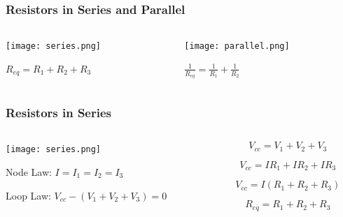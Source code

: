 \documentclass{beamer}
\begin{document}
\begin{frame}
\frametitle{Resistors in Series and Parallel}
\begin{columns}
\begin{column}{5cm}
\begin{center}
\texttt{[image: series.png]}

\vspace{0.5cm}

$R_{eq} = R_1+R_2+R_3$
\end{center}
\end{column}
\begin{column}{5cm}
\begin{center}
\texttt{[image: parallel.png]}

\vspace{0.5cm}

$\frac{1}{R_{eq}} = \frac{1}{R_1}+\frac{1}{R_2}$
\end{center}
\end{column}
\end{columns}
\end{frame}

\begin{frame}\frametitle{Resistors in Series}
\begin{columns}
\begin{column}{5cm}
\begin{center}
\texttt{[image: series.png]}

\vspace{0.5cm}

Node Law: $I = I_1 = I_2 = I_3$

\vspace{0.2cm}

Loop Law: $V_{cc} - (V_1 + V_2 + V_3) = 0$

\end{center}
\end{column}
\begin{column}{5cm}

\begin{equation}
V_{cc} = V_1 + V_2 + V_3
\end{equation}

\begin{equation}
V_{cc} = I R_1 + I R_2 + I R_3
\end{equation}

\begin{equation}
V_{cc} = I (R_1 + R_2 + R_3)
\end{equation}

\begin{equation}
\boxed{R_{eq} = R_1 + R_2 + R_3}
\end{equation}

\end{column}
\end{columns}
\end{frame}
\end{document}
